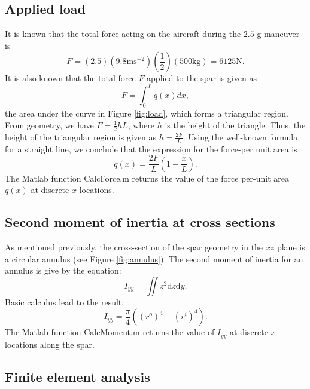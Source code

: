 \documentclass[11pt]{article}
\begin{document}
\subsection{Applied load}

It is known that the total force acting on the aircraft
during the $2.5$ g maneuver is
\begin{equation}
F = (2.5)(9.8 \text{m}\text{s}^{-2})(\frac12)(500 \text{kg}) = 6125 \text{N}.
\end{equation}
It is also known that the total force $F$ applied to the
spar is given as
\begin{equation}
F = \int_0 ^L q(x) dx,
\end{equation}
the area under the curve in Figure \ref{fig:load}, which
forms a triangular region. From geometry, we have $F = \frac12 h L$,
where $h$ is the height of the triangle. Thus, the height
of the triangular region is given as $h = \frac{2F}{L}$.
Using the well-known formula for a straight line, we conclude that
the expression for the force-per unit area is
\begin{equation}
q(x) = \frac{2F}{L} \left( 1 - \frac{x}{L} \right).
\end{equation}
The Matlab function CalcForce.m returns the value
of the force per-unit area $q(x)$ at discrete $x$
locations.

\subsection{Second moment of inertia at cross sections}

As mentioned previously, the cross-section of the spar
geometry in the $xz$ plane is a circular annulus
(see Figure \ref{fig:annulus}). The second moment
of inertia for an annulus is give by the equation:
\begin{equation}
I_{yy} = \iint z^2 \text{d} z \text{d} y.
\end{equation}
Basic calculus lead to the result:
\begin{equation}
I_{yy} = \frac{\pi}{4} \left ( (r^o)^4 - (r^i)^4 \right).
\end{equation}
The Matlab function CalcMoment.m returns the value
of $I_{yy}$ at discrete $x$-locations along the spar.

\subsection{Finite element analysis}
\end{document}
